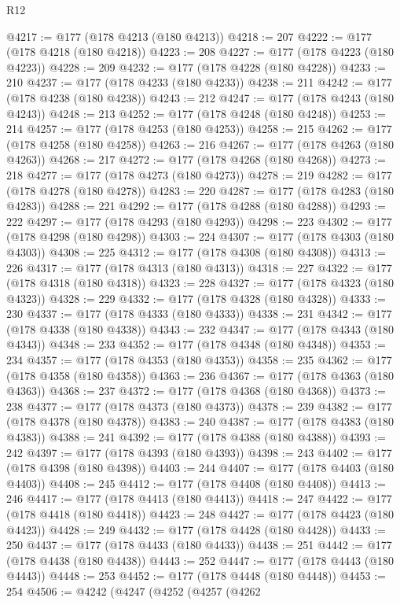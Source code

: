 \begin{lexlean}{R12}
\begin{coremodule}
{{{{{{{{{{{{{{{{{{{{{{{{{{{{{{{{{{{{{{{{{{{{{{{{{{{{{{{{{{{{{{{{{{{{{{{{{{{{{{{{{{@4217 := @177 (@178 @4213 (@180 @4213))
@4218 := 207
@4222 := @177 (@178 @4218 (@180 @4218))
@4223 := 208
@4227 := @177 (@178 @4223 (@180 @4223))
@4228 := 209
@4232 := @177 (@178 @4228 (@180 @4228))
@4233 := 210
@4237 := @177 (@178 @4233 (@180 @4233))
@4238 := 211
@4242 := @177 (@178 @4238 (@180 @4238))
@4243 := 212
@4247 := @177 (@178 @4243 (@180 @4243))
@4248 := 213
@4252 := @177 (@178 @4248 (@180 @4248))
@4253 := 214
@4257 := @177 (@178 @4253 (@180 @4253))
@4258 := 215
@4262 := @177 (@178 @4258 (@180 @4258))
@4263 := 216
@4267 := @177 (@178 @4263 (@180 @4263))
@4268 := 217
@4272 := @177 (@178 @4268 (@180 @4268))
@4273 := 218
@4277 := @177 (@178 @4273 (@180 @4273))
@4278 := 219
@4282 := @177 (@178 @4278 (@180 @4278))
@4283 := 220
@4287 := @177 (@178 @4283 (@180 @4283))
@4288 := 221
@4292 := @177 (@178 @4288 (@180 @4288))
@4293 := 222
@4297 := @177 (@178 @4293 (@180 @4293))
@4298 := 223
@4302 := @177 (@178 @4298 (@180 @4298))
@4303 := 224
@4307 := @177 (@178 @4303 (@180 @4303))
@4308 := 225
@4312 := @177 (@178 @4308 (@180 @4308))
@4313 := 226
@4317 := @177 (@178 @4313 (@180 @4313))
@4318 := 227
@4322 := @177 (@178 @4318 (@180 @4318))
@4323 := 228
@4327 := @177 (@178 @4323 (@180 @4323))
@4328 := 229
@4332 := @177 (@178 @4328 (@180 @4328))
@4333 := 230
@4337 := @177 (@178 @4333 (@180 @4333))
@4338 := 231
@4342 := @177 (@178 @4338 (@180 @4338))
@4343 := 232
@4347 := @177 (@178 @4343 (@180 @4343))
@4348 := 233
@4352 := @177 (@178 @4348 (@180 @4348))
@4353 := 234
@4357 := @177 (@178 @4353 (@180 @4353))
@4358 := 235
@4362 := @177 (@178 @4358 (@180 @4358))
@4363 := 236
@4367 := @177 (@178 @4363 (@180 @4363))
@4368 := 237
@4372 := @177 (@178 @4368 (@180 @4368))
@4373 := 238
@4377 := @177 (@178 @4373 (@180 @4373))
@4378 := 239
@4382 := @177 (@178 @4378 (@180 @4378))
@4383 := 240
@4387 := @177 (@178 @4383 (@180 @4383))
@4388 := 241
@4392 := @177 (@178 @4388 (@180 @4388))
@4393 := 242
@4397 := @177 (@178 @4393 (@180 @4393))
@4398 := 243
@4402 := @177 (@178 @4398 (@180 @4398))
@4403 := 244
@4407 := @177 (@178 @4403 (@180 @4403))
@4408 := 245
@4412 := @177 (@178 @4408 (@180 @4408))
@4413 := 246
@4417 := @177 (@178 @4413 (@180 @4413))
@4418 := 247
@4422 := @177 (@178 @4418 (@180 @4418))
@4423 := 248
@4427 := @177 (@178 @4423 (@180 @4423))
@4428 := 249
@4432 := @177 (@178 @4428 (@180 @4428))
@4433 := 250
@4437 := @177 (@178 @4433 (@180 @4433))
@4438 := 251
@4442 := @177 (@178 @4438 (@180 @4438))
@4443 := 252
@4447 := @177 (@178 @4443 (@180 @4443))
@4448 := 253
@4452 := @177 (@178 @4448 (@180 @4448))
@4453 := 254
@4506 := @4242
    (@4247
      (@4252
        (@4257
          (@4262
}}}}}}}}}}}}}}}}}}}}}}}}}}}}}}}}}}}}}}}}}}}}}}}}}}}}}}}}}}}}}}}}}}}}}}}}}}}}}}}}}}
\end{coremodule}
\end{lexlean}
